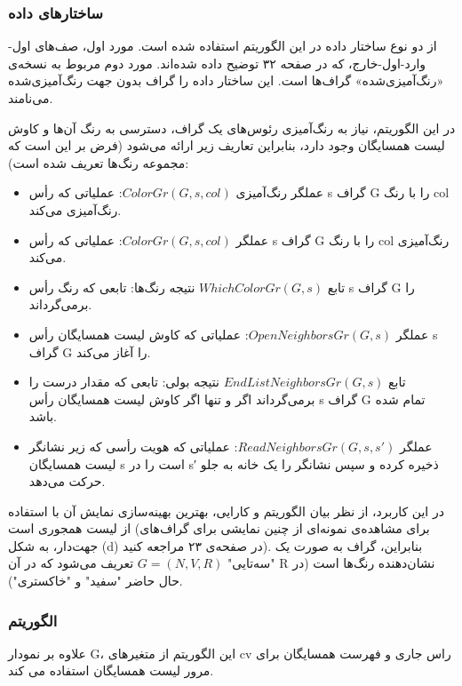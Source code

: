 \documentclass{book} %
\begin{document}
\subsubsection*{ساختارهای داده}

از دو نوع ساختار داده در این الگوریتم استفاده شده است. مورد اول، صف‌های اول-وارد-اول-خارج، که در صفحه ۳۲ توضیح داده شده‌اند. مورد دوم مربوط به نسخه‌ی «رنگ‌آمیزی‌شده» گراف‌ها است.
این ساختار داده را گراف بدون جهت رنگ‌آمیزی‌شده می‌نامند.

در این الگوریتم، نیاز به رنگ‌آمیزی رئوس‌های یک گراف، دسترسی به رنگ آن‌ها و کاوش لیست همسایگان وجود دارد، بنابراین تعاریف زیر ارائه می‌شود (فرض بر این است که مجموعه رنگ‌ها تعریف شده است):


\begin{itemize}
    \item عملگر رنگ‌آمیزی‌ $ColorGr(G, s, col)$: عملیاتی که رأس s گراف G را با رنگ col رنگ‌آمیزی می‌کند.
   
    \item عملگر $ColorGr(G, s, col)$: عملیاتی که رأس s گراف G را با رنگ col رنگ‌آمیزی می‌کند.
    \item تابع $WhichColorGr(G, s)$ نتیجه رنگ‌ها: تابعی که رنگ رأس s گراف G را برمی‌گرداند.
    \item عملگر $OpenNeighborsGr(G, s)$: عملیاتی که کاوش لیست همسایگان رأس s گراف G را آغاز می‌کند.
    \item تابع $EndListNeighborsGr(G, s)$ نتیجه بولی: تابعی که مقدار درست را برمی‌گرداند اگر و تنها اگر کاوش لیست همسایگان رأس s گراف G تمام شده باشد.
    \item عملگر $ReadNeighborsGr(G, s, s′)$: عملیاتی که هویت رأسی که زیر نشانگر لیست همسایگان s است را در s′ ذخیره کرده و سپس نشانگر را یک خانه به جلو حرکت می‌دهد.
    
\end{itemize}

در این کاربرد، از نظر بیان الگوریتم و کارایی، بهترین بهینه‌سازی نمایش آن با استفاده از لیست همجوری است (برای مشاهده‌ی نمونه‌ای از چنین نمایشی برای گراف‌های جهت‌دار، به شکل (d) در صفحه‌ی ۲۳ مراجعه کنید). بنابراین، گراف به صورت یک "سه‌تایی" $G = (N, V, R)$ تعریف می‌شود که در آن R نشان‌دهنده رنگ‌ها است (در حال حاضر "سفید" و "خاکستری").

\subsubsection*{الگوریتم}

علاوه بر نمودار G، این الگوریتم از متغیرهای cv راس جاری و فهرست همسایگان برای مرور لیست همسایگان استفاده می کند.
\end{document}
